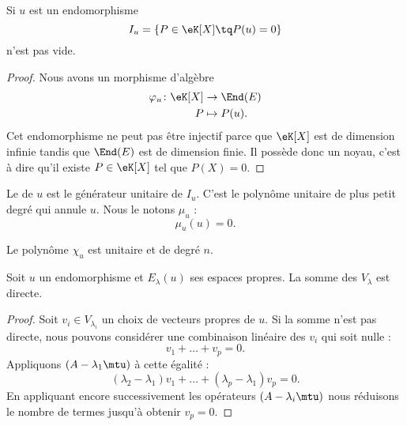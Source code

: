 \begin{lemma}
    Si \( u\) est un endomorphisme
    \begin{equation}
        I_u=\{ P\in \eK[X] \tq P(u)=0\}
    \end{equation}
    n'est pas vide.
\end{lemma}

\begin{proof}
    Nous avons un morphisme d'algèbre
    \begin{equation}
        \begin{aligned}
            \varphi_u\colon\eK[X]&\to \End(E) \\
            P&\mapsto P(u). 
        \end{aligned}
    \end{equation}
    Cet endomorphisme ne peut pas être injectif parce que \(\eK[X]\) est de dimension infinie tandis que \( \End(E)\) est de dimension finie. Il possède donc un noyau, c'est à dire qu'il existe \( P\in\eK[X]\) tel que \( P(X)=0\).
\end{proof}

\begin{definition}
    Le  de \( u\) est le générateur unitaire de \( I_u\). C'est le polynôme unitaire de plus petit degré qui annule \( u\). Nous le notons \( \mu_u\) :
\begin{equation}
    \mu_u(u)=0.
\end{equation}
\end{definition}

\begin{lemma}
    Le polynôme \( \chi_u\) est unitaire et de degré \( n\).
\end{lemma}

\begin{lemma}       \label{LemjcztYH}
    Soit \( u\) un endomorphisme et \( E_{\lambda}(u)\) ses espaces propres. La somme des \( V_{\lambda}\) est directe.
\end{lemma}

\begin{proof}
    Soit \( v_i\in V_{\lambda_i}\) un choix de vecteurs propres de \( u\). Si la somme n'est pas directe, nous pouvons considérer une combinaison linéaire des \( v_i\) qui soit nulle :
    \begin{equation}
        v_1+\ldots+v_p=0.
    \end{equation}
    Appliquons \( (A-\lambda_1\mtu)\) à cette égalité :
    \begin{equation}
        (\lambda_2-\lambda_1)v_1+\ldots+(\lambda_p-\lambda_1)v_p=0.
    \end{equation}
    En appliquant encore successivement les opérateurs \( (A-\lambda_i\mtu)\) nous réduisons le nombre de termes jusqu'à obtenir \( v_p=0\).
\end{proof}


